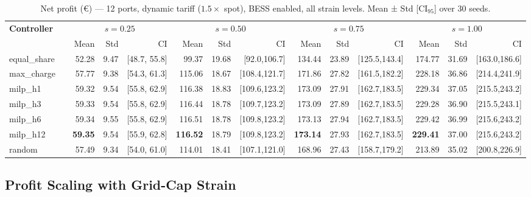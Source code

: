 \begin{table}[!htb]
\centering
\caption{Net profit (€) — 12 ports, dynamic tariff ($1.5\times$ spot), BESS enabled,
         all strain levels. Mean ± Std [CI$_{95}$] over 30 seeds.}
\label{tab:gc_12port_dynamic}
\setlength{\tabcolsep}{3pt}
\begin{tabular}{lp{1cm} rrr rrr rrr rrr}
\toprule
\textbf{Controller} & &
  \multicolumn{3}{c}{$s=0.25$} &
  \multicolumn{3}{c}{$s=0.50$} &
  \multicolumn{3}{c}{$s=0.75$} &
  \multicolumn{3}{c}{$s=1.00$} \\
\cmidrule(lr){3-5}\cmidrule(lr){6-8}\cmidrule(lr){9-11}\cmidrule(lr){12-14}
 & & Mean & Std & CI & Mean & Std & CI & Mean & Std & CI & Mean & Std & CI \\
\midrule
equal\_share & &  52.28 &  9.47 & [48.7, 55.8] &  99.37 & 19.68 & [92.0,106.7] & 134.44 & 23.89 & [125.5,143.4] & 174.77 & 31.69 & [163.0,186.6] \\
max\_charge  & &  57.77 &  9.38 & [54.3, 61.3] & 115.06 & 18.67 & [108.4,121.7] & 171.86 & 27.82 & [161.5,182.2] & 228.18 & 36.86 & [214.4,241.9] \\
milp\_h1     & &  59.32 &  9.54 & [55.8, 62.9] & 116.38 & 18.83 & [109.6,123.2] & 173.09 & 27.91 & [162.7,183.5] & 229.34 & 37.05 & [215.5,243.2] \\
milp\_h3     & &  59.33 &  9.54 & [55.8, 62.9] & 116.44 & 18.78 & [109.7,123.2] & 173.09 & 27.89 & [162.7,183.5] & 229.28 & 36.90 & [215.5,243.1] \\
milp\_h6     & &  59.34 &  9.55 & [55.8, 62.9] & 116.51 & 18.78 & [109.8,123.2] & 173.13 & 27.94 & [162.7,183.5] & 229.42 & 36.99 & [215.6,243.2] \\
milp\_h12    & & \textbf{59.35} &  9.54 & [55.9, 62.8] & \textbf{116.52} & 18.79 & [109.8,123.2] & \textbf{173.14} & 27.93 & [162.7,183.5] & \textbf{229.41} & 37.00 & [215.6,243.2] \\
random       & &  57.49 &  9.34 & [54.0, 61.0] & 114.01 & 18.41 & [107.1,121.0] & 168.96 & 27.43 & [158.7,179.2] & 213.89 & 35.02 & [200.8,226.9] \\
\bottomrule
\end{tabular}
\end{table}

\subsection{Profit Scaling with Grid-Cap Strain}
\label{subsec:gc_scaling}

